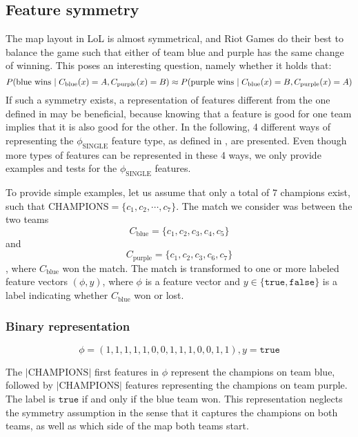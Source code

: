 \subsection{Feature symmetry}
\label{sec:representationoffeatures}
The map layout in LoL is almost symmetrical, and Riot Games do their best to balance the game such that either of team blue and purple has the same change of winning.
This poses an interesting question, namely whether it holds that:
\[
P(\text{blue wins } | \; C_\text{blue}(x) = A, C_\text{purple}(x) = B) \\
\approx\\
P(\text{purple wins } | \; C_\text{blue}(x) = B, C_\text{purple}(x) = A)
\]
If such a symmetry exists, a representation of features different from the one defined in  may be beneficial, because knowing that a feature is good for one team implies that it is also good for the other.
In the following, 4 different ways of representing the $\phi_\text{SINGLE}$ feature type, as defined in , are presented.
Even though more types of features can be represented in these 4 ways, we only provide examples and tests for the $\phi_\text{SINGLE}$ features.

To provide simple examples, let us assume that only a total of $7$ champions exist, such that $\text{CHAMPIONS} = \{c_1, c_2, \cdots, c_7\}$.
The match we consider was between the two teams \[C_\text{blue} = \{c_1, c_2, c_3, c_4, c_5\}\] 
and
\[C_\text{purple} = \{c_1, c_2, c_3, c_6, c_7\}\],
 where $C_\text{blue}$ won the match. The match is transformed to one or more labeled feature vectors $(\phi, y)$, where $\phi$ is a feature vector and $y \in \{\mathtt{true}, \mathtt{false}\}$ is a label indicating whether $C_\text{blue}$ won or lost.

\subsubsection{Binary representation}

\[ \phi = (1,1,1,1,1,0,0,1,1,1,0,0,1,1), y = \mathtt{true} \]

The $|\text{CHAMPIONS}|$ first features in $\phi$ represent the champions on team blue, followed by $|\text{CHAMPIONS}|$ features representing the champions on team purple. The label is $\mathtt{true}$ if and only if the blue team won.
This representation neglects the symmetry assumption in the sense that it captures the champions on both teams, as well as which side of the map both teams start.


